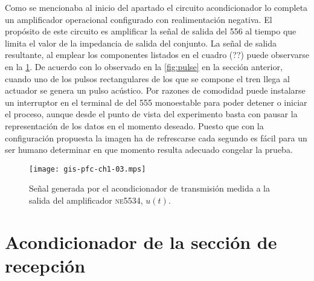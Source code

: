 Como se mencionaba al inicio del apartado el circuito acondicionador lo
completa un amplificador operacional configurado con realimentación
negativa. El propósito de este circuito es amplificar la señal de salida
del 556 al tiempo que limita el valor de la impedancia de salida del
conjunto. La señal de salida resultante, al emplear los componentes
listados en el cuadro (??) puede observarse en la \cref{fig:txacvo}. De
acuerdo con lo observado en la \cref{fig:pulse} en la sección anterior,
cuando uno de los pulsos rectangulares de los que se compone el tren llega
al actuador se genera un pulso acústico. Por razones de comodidad puede
instalarse un interruptor en el terminal de  del 555
monoestable para poder detener o iniciar el proceso, aunque desde el punto
de vista del experimento basta con pausar la representación de los datos en
el momento deseado. Puesto que con la configuración propuesta la imagen ha
de refrescarse cada segundo es fácil para un ser humano determinar en que
momento resulta adecuado congelar la prueba.

\begin{figure}
	\begin{center}
		\texttt{[image: gis-pfc-ch1-03.mps]}
	\end{center}
	\caption[Señal a la salida del amplificador \textsc{ne5534},
	$u(t)$]{Señal generada por el acondicionador de transmisión medida
	a la salida del amplificador \textsc{ne5534}, $u(t)$.}
	\label{fig:txacvo}
\end{figure}


\section{Acondicionador de la sección de recepción}\label{sec:rxco}
